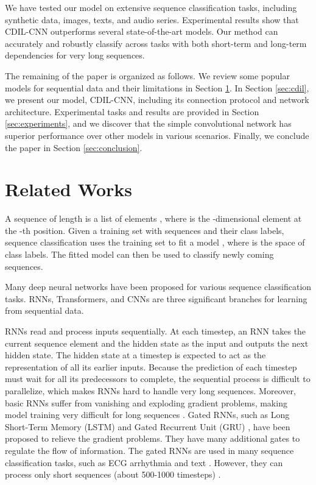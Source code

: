 \documentclass{article}
\begin{document}
We have tested our model on extensive sequence classification tasks, including synthetic data, images, texts, and audio series. Experimental results show that CDIL-CNN outperforms several state-of-the-art models. Our method can accurately and robustly classify across tasks with both short-term and long-term dependencies for very long sequences.

The remaining of the paper is organized as follows. We review some popular models for sequential data and their limitations in Section \ref{sec:related}. In Section \ref{sec:cdil}, we present our model, CDIL-CNN, including its connection protocol and network architecture. Experimental tasks and results are provided in Section \ref{sec:experiments}, and we discover that the simple convolutional network has superior performance over other models in various scenarios. Finally, we conclude the paper in Section \ref{sec:conclusion}.


\section{Related Works}
\label{sec:related}

A sequence  of length  is a list of elements , where  is the -dimensional element at the -th position. Given a training set  with  sequences and their class labels, sequence classification uses the training set to fit a model , where  is the space of class labels. The fitted model can then be used to classify newly coming sequences.

Many deep neural networks have been proposed for various sequence classification tasks. RNNs, Transformers, and CNNs are three significant branches for learning from sequential data.

RNNs read and process inputs sequentially. At each timestep, an RNN takes the current sequence element and the hidden state as the input and outputs the next hidden state. The hidden state at a timestep is expected to act as the representation of all its earlier inputs. Because the prediction of each timestep must wait for all its predecessors to complete, the sequential process is difficult to parallelize, which makes RNNs hard to handle very long sequences. Moreover, basic RNNs suffer from vanishing and exploding gradient problems, making model training very difficult for long sequences \cite{bengio1994learning}. Gated RNNs, such as Long Short-Term Memory (LSTM) \cite{hochreiter1997long} and Gated Recurrent Unit (GRU) \cite{cho2014properties}, have been proposed to relieve the gradient problems. They have many additional gates to regulate the flow of information. The gated RNNs are used in many sequence classification tasks, such as ECG arrhythmia \cite{singh2018classification} and text \cite{sharfuddin2018deep, du2020novel}. However, they can process only short sequences (about 500-1000 timesteps) \cite{li2018independently}.
\end{document}
